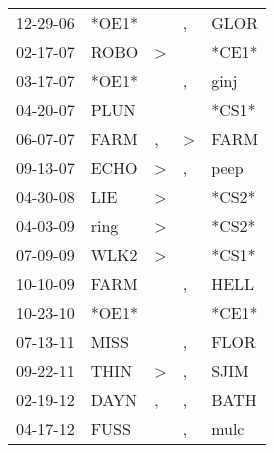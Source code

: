 \begin{supertabular}{p{0.07\textwidth}p{0.06\textwidth}p{0.02\textwidth}p{0.02\textwidth}p{0.06\textwidth}}
 12-29-06\textsuperscript{} &                   *OE1* &               &             , &           GLOR\textsuperscript{} \\
 02-17-07\textsuperscript{} &  ROBO\textsuperscript{} &  \textgreater &               &                            *CE1* \\
 03-17-07\textsuperscript{} &                   *OE1* &               &             , &           ginj\textsuperscript{} \\
 04-20-07\textsuperscript{} &  PLUN\textsuperscript{} &               &               &                            *CS1* \\
 06-07-07\textsuperscript{} &  FARM\textsuperscript{} &             , &  \textgreater &           FARM\textsuperscript{} \\
 09-13-07\textsuperscript{} &  ECHO\textsuperscript{} &  \textgreater &             , &           peep\textsuperscript{} \\
 04-30-08\textsuperscript{} &   LIE\textsuperscript{} &  \textgreater &               &                            *CS2* \\
 04-03-09\textsuperscript{} &  ring\textsuperscript{} &  \textgreater &               &                            *CS2* \\
 07-09-09\textsuperscript{} &  WLK2\textsuperscript{} &  \textgreater &               &                            *CS1* \\
 10-10-09\textsuperscript{} &  FARM\textsuperscript{} &               &             , &           HELL\textsuperscript{} \\
 10-23-10\textsuperscript{} &                   *OE1* &               &               &                            *CE1* \\
 07-13-11\textsuperscript{} &  MISS\textsuperscript{} &               &             , &           FLOR\textsuperscript{} \\
 09-22-11\textsuperscript{} &  THIN\textsuperscript{} &  \textgreater &             , &           SJIM\textsuperscript{} \\
 02-19-12\textsuperscript{} &  DAYN\textsuperscript{} &             , &             , &           BATH\textsuperscript{} \\
 04-17-12\textsuperscript{} &  FUSS\textsuperscript{} &               &             , &           mulc\textsuperscript{} \\

\end{supertabular}
